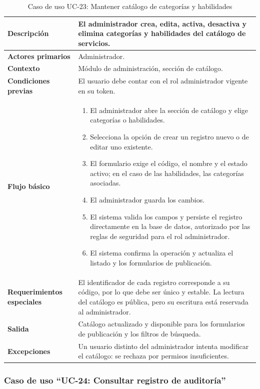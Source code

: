 \documentclass[doc,12pt,a4paper]{apa7}
\begin{document}
\begin{longtable}{|P{3.3cm}|L{11.2cm}|}
\caption{Caso de uso UC-23: Mantener catálogo de categorías y habilidades}\\
\hline
\textbf{Descripción} & El administrador crea, edita, activa, desactiva y elimina categorías y habilidades del catálogo de servicios. \\ \hline
\textbf{Actores primarios} & Administrador. \\ \hline
\textbf{Contexto} & Módulo de administración, sección de catálogo. \\ \hline
\textbf{Condiciones previas} & El usuario debe contar con el rol administrador vigente en su token. \\ \hline
\textbf{Flujo básico} &
\begin{enumerate}
    \item El administrador abre la sección de catálogo y elige categorías o habilidades.
    \item Selecciona la opción de crear un registro nuevo o de editar uno existente.
    \item El formulario exige el código, el nombre y el estado activo; en el caso de las habilidades, las categorías asociadas.
    \item El administrador guarda los cambios.
    \item El sistema valida los campos y persiste el registro directamente en la base de datos, autorizado por las reglas de seguridad para el rol administrador.
    \item El sistema confirma la operación y actualiza el listado y los formularios de publicación.
\end{enumerate} \\ \hline
\textbf{Requerimientos especiales} & El identificador de cada registro corresponde a su código, por lo que debe ser único y estable. La lectura del catálogo es pública, pero su escritura está reservada al administrador. \\ \hline
\textbf{Salida} & Catálogo actualizado y disponible para los formularios de publicación y los filtros de búsqueda. \\ \hline
\textbf{Excepciones} & Un usuario distinto del administrador intenta modificar el catálogo: se rechaza por permisos insuficientes. \\ \hline
\end{longtable}

\subsubsection{Caso de uso ``UC-24: Consultar registro de auditoría''}
\end{document}
